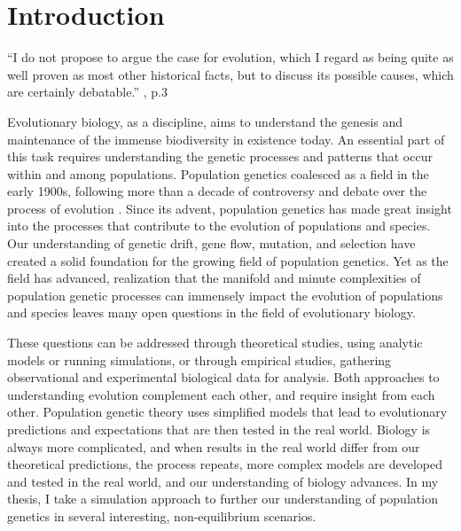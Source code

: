\chapter{Introduction}
\label{chap:introduction}

\begin{quoteshrink}
  ``I do not propose to argue the case for evolution, which I regard as being quite as well proven as most other historical facts, but to discuss its possible causes, which are certainly debatable.''
  \hfill\citet{Haldane:1932}, p.3
\end{quoteshrink}

\noindent



Evolutionary biology, as a discipline, aims to understand the genesis and maintenance of the immense biodiversity in existence today. An essential part of this task requires understanding the genetic processes and patterns that occur within and among populations. Population genetics coalesced as a field in the early 1900s, following more than a decade of controversy and debate over the process of evolution \citep{Provine:2001}. Since its advent, population genetics has made great insight into the processes that contribute to the evolution of populations and species. Our understanding of genetic drift, gene flow, mutation, and selection have created a solid foundation for the growing field of population genetics. Yet as the field has advanced, realization that the manifold and minute complexities of population genetic processes can immensely impact the evolution of populations and species leaves many open questions in the field of evolutionary biology.

These questions can be addressed through theoretical studies, using analytic models or running simulations, or through empirical studies, gathering observational and experimental biological data for analysis. Both approaches to understanding evolution complement each other, and require insight from each other. Population genetic theory uses simplified models that lead to evolutionary predictions and expectations that are then tested in the real world. Biology is always more complicated, and when results in the real world differ from our theoretical predictions, the process repeats, more complex models are developed and tested in the real world, and our understanding of biology advances. In my thesis, I take a simulation approach to further our understanding of population genetics in several interesting, non-equilibrium scenarios.

